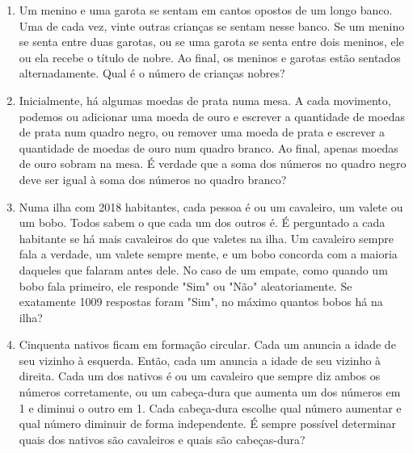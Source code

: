 \documentclass{article}
\begin{document}
\begin{enumerate}
    \item Um menino e uma garota se sentam em cantos opostos de um longo banco. Uma de cada vez, vinte outras crianças se sentam nesse banco. Se um menino se senta entre duas garotas, ou se uma garota se senta entre dois meninos, ele ou ela recebe o título de nobre. Ao final, os meninos e garotas estão sentados alternadamente. Qual é o número de crianças nobres?

    \item Inicialmente, há algumas moedas de prata numa mesa. A cada movimento, podemos ou adicionar uma moeda de ouro e escrever a quantidade de moedas de prata num quadro negro, ou remover uma moeda de prata e escrever a quantidade de moedas de ouro num quadro branco. Ao final, apenas moedas de ouro sobram na mesa. É verdade que a soma dos números no quadro negro deve ser igual à soma dos números no quadro branco?

    \item Numa ilha com 2018 habitantes, cada pessoa é ou um cavaleiro, um valete ou um bobo. Todos sabem o que cada um dos outros é. É perguntado a cada habitante se há mais cavaleiros do que valetes na ilha. Um cavaleiro sempre fala a verdade, um valete sempre mente, e um bobo concorda com a maioria daqueles que falaram antes dele. No caso de um empate, como quando um bobo fala primeiro, ele responde "Sim" ou "Não" aleatoriamente. Se exatamente 1009 respostas foram "Sim", no máximo quantos bobos há na ilha?

    \item Cinquenta nativos ficam em formação circular. Cada um anuncia a idade de seu vizinho à esquerda. Então, cada um anuncia a idade de seu vizinho à direita. Cada um dos nativos é ou um cavaleiro que sempre diz ambos os números corretamente, ou um cabeça-dura que aumenta um dos números em 1 e diminui o outro em 1. Cada cabeça-dura escolhe qual número aumentar e qual número diminuir de forma independente. É sempre possível determinar quais dos nativos são cavaleiros e quais são cabeças-dura?
\end{enumerate}
\end{document}
